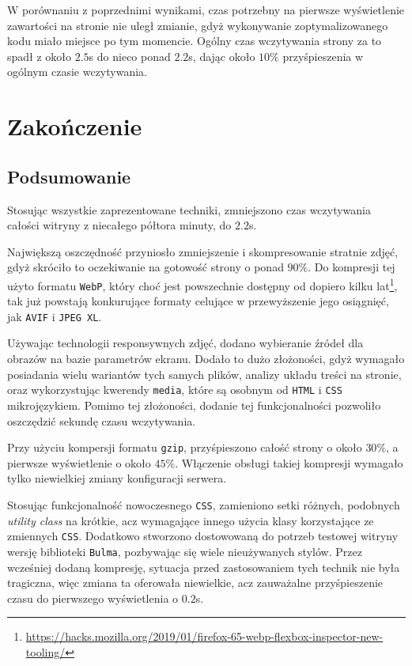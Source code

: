 \documentclass[licencjacka]{pracadypl}
\begin{document}
W porównaniu z poprzednimi wynikami, czas potrzebny na pierwsze wyświetlenie zawartości na stronie nie uległ zmianie, gdyż wykonywanie zoptymalizowanego kodu miało miejsce po tym momencie. Ogólny czas wczytywania strony za to spadł z około $2.5$s do nieco ponad $2.2$s, dając około $10\%$ przyśpieszenia w ogólnym czasie wczytywania.

\chapter{Zakończenie}

\section{Podsumowanie}

Stosując wszystkie zaprezentowane techniki, zmniejszono czas wczytywania całości witryny z niecałego półtora minuty, do $2.2$s. 

Największą oszczędność przyniosło zmniejszenie i skompresowanie stratnie zdjęć, gdyż skróciło to oczekiwanie na gotowość strony o ponad $90\%$. Do kompresji tej użyto formatu \texttt{WebP}, który choć jest powszechnie dostępny od dopiero kilku lat\footnote{\url{https://hacks.mozilla.org/2019/01/firefox-65-webp-flexbox-inspector-new-tooling/}}, tak już powstają konkurujące formaty celujące w przewyższenie jego osiągnięć, jak \texttt{AVIF} i \texttt{JPEG XL}.

Używając technologii responsywnych zdjęć, dodano wybieranie źródeł dla obrazów \linebreak na bazie parametrów ekranu. Dodało to dużo złożoności, gdyż wymagało posiadania wielu wariantów tych samych plików, analizy układu treści na stronie, oraz wykorzystując kwerendy \texttt{media}, które są osobnym od \texttt{HTML} i \texttt{CSS} mikrojęzykiem. Pomimo tej złożoności, dodanie tej funkcjonalności pozwoliło oszczędzić sekundę czasu wczytywania.

Przy użyciu kompersji formatu \texttt{gzip}, przyśpieszono całość strony o około $30\%$, a pierwsze wyświetlenie o około $45\%$. Włączenie obsługi takiej kompresji wymagało tylko niewielkiej zmiany konfiguracji serwera.

Stosując funkcjonalność nowoczesnego \texttt{CSS}, zamieniono setki różnych, podobnych \emph{utility class} na krótkie, acz wymagające innego użycia klasy korzystające ze zmiennych \texttt{CSS}. Dodatkowo stworzono dostowowaną do potrzeb testowej witryny wersję biblioteki \texttt{Bulma}, pozbywając się wiele nieużywanych stylów. Przez wcześniej dodaną kompresję, sytuacja przed zastosowaniem tych technik nie była tragiczna, więc zmiana ta oferowała niewielkie, acz zauważalne przyśpieszenie czasu do pierwszego wyświetlenia o $0.2$s.
\end{document}
